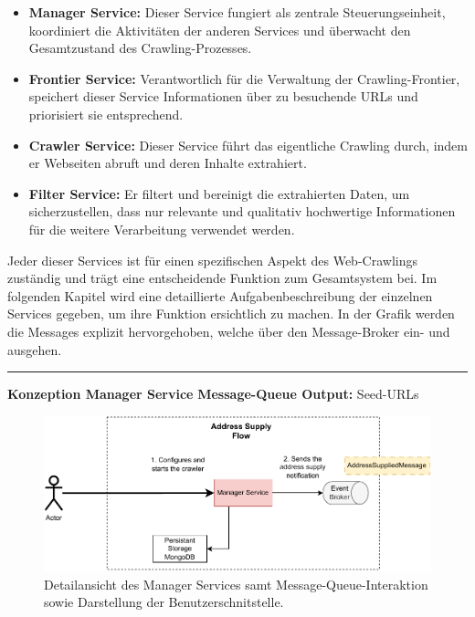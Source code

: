 \begin{itemize}
    \item \textbf{Manager Service:} Dieser Service fungiert als zentrale Steuerungseinheit, koordiniert die Aktivitäten der anderen Services und überwacht den Gesamtzustand des Crawling-Prozesses.
    \item \textbf{Frontier Service:} Verantwortlich für die Verwaltung der Crawling-Frontier, speichert dieser Service Informationen über zu besuchende URLs und priorisiert sie entsprechend.
    \item \textbf{Crawler Service:} Dieser Service führt das eigentliche Crawling durch, indem er Webseiten abruft und deren Inhalte extrahiert.
    \item \textbf{Filter Service:} Er filtert und bereinigt die extrahierten Daten, um sicherzustellen, dass nur relevante und qualitativ hochwertige Informationen für die weitere Verarbeitung verwendet werden.
\end{itemize}

Jeder dieser Services ist für einen spezifischen Aspekt des Web-Crawlings zuständig und trägt eine entscheidende Funktion zum Gesamtsystem bei. Im folgenden Kapitel wird eine detaillierte Aufgabenbeschreibung der einzelnen Services gegeben, um ihre Funktion ersichtlich zu machen. In der Grafik werden die Messages explizit hervorgehoben, welche über den Message-Broker ein- und ausgehen.

\noindent\rule{\textwidth}{1pt}

\textbf{Konzeption Manager Service}\newline
\textbf{Message-Queue Output:} Seed-URLs\newline
\begin{figure}[H]
    \centering
    \includegraphics[width=14cm]{images/40_concept/ManagerService.drawio.pdf}
    \caption[Detailansicht des Manager Services]{Detailansicht des Manager Services samt Message-Queue-Interaktion sowie Darstellung der Benutzerschnitstelle.}
    \label{fig:ManagerService}
\end{figure}

